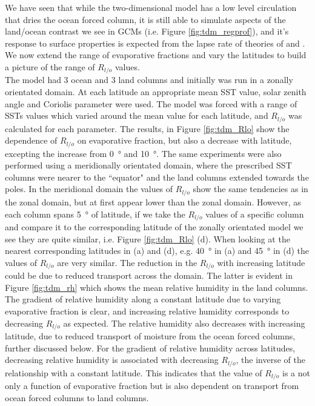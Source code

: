 We have seen that while the two-dimensional model has a low level circulation 
that dries the ocean forced column, it is still able to simulate aspects of the 
land/ocean contrast we see in GCMs (i.e. Figure \ref{fig:tdm_regprof}), and it's 
response to surface properties is expected from the lapse rate of theories of 
\cite{Joshi2007} and \cite{Byrne2013a}. We now extend the range of evaporative 
fractions and vary the latitudes to build a picture of the range of $R_{l/o}$ 
values.\\
The model had 3 ocean and 3 land columns and initially was run in a zonally 
orientated domain. At each latitude an appropriate mean SST value, solar zenith 
angle and Coriolis parameter were used.  The model was forced with a range of 
SSTs values which varied around the mean value for each latitude, and $R_{l/o}$ 
was calculated for each parameter.	The results, in Figure \ref{fig:tdm_Rlo} 
show the dependence of $R_{l/o}$ on evaporative fraction, but also a decrease 
with latitude, excepting the increase from \SI{0}{\degree} and \SI{10}{\degree}.  
The same experiments were also performed using a meridionally orientated domain, 
where the prescribed SST columns were nearer to the ``equator" and the land 
columns extended towards the poles.  In the meridional domain the values of 
$R_{l/o}$ show the same tendencies as in the zonal domain, but at first appear 
lower than the zonal domain. However, as each column spans \SI{5}{\degree} of 
latitude, if we take the $R_{l/o}$ values of a specific column and compare it to 
the corresponding latitude of the zonally orientated model we see they are quite 
similar, i.e. Figure \ref{fig:tdm_Rlo} (d). When looking at the nearest 
corresponding latitudes in (a) and (d), e.g. \SI{40}{\degree} in (a) and 
\SI{45}{\degree} in (d) the values of $R_{l/o}$ are very similar.  The reduction 
in the $R_{l/o}$ with increasing latitude could be due to reduced transport 
across the domain. The latter is evident in Figure \ref{fig:tdm_rh} which shows 
the mean relative humidity in the land columns. The gradient of relative 
humidity along a constant latitude due to varying evaporative fraction is clear, 
and increasing relative humidity corresponds to decreasing $R_{l/o}$ as 
expected.  The relative humidity also decreases with increasing latitude, due to 
reduced transport of moisture from the ocean forced columns, further discussed 
below.  For the gradient of relative humidity across latitudes, decreasing 
relative humidity is associated with decreasing $R_{l/o}$, the inverse of the 
relationship with a constant latitude.  This indicates that the value of 
$R_{l/o}$ is a not only a function of evaporative fraction but is also dependent 
on transport from ocean forced columns to land columns.\\

